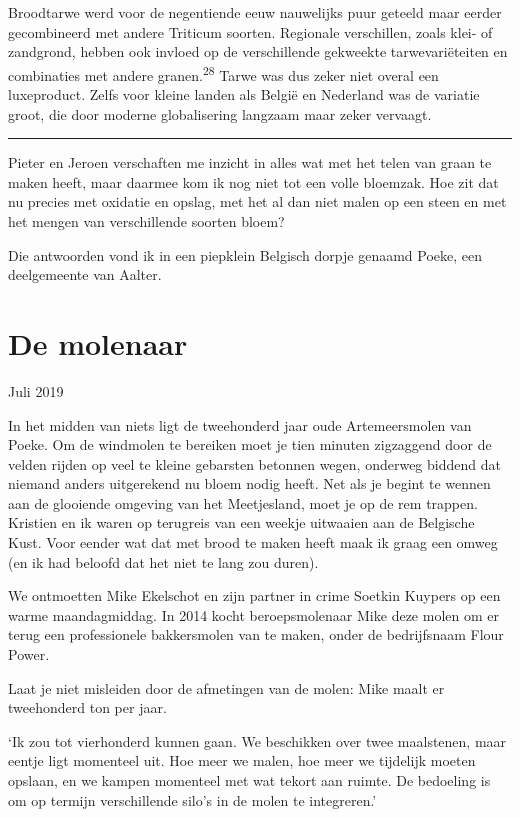 \documentclass[
  11pt,
  dutch,
]{memoir}
\begin{document}
Broodtarwe werd voor de negentiende eeuw nauwelijks puur geteeld maar
eerder gecombineerd met andere Triticum soorten. Regionale verschillen,
zoals klei- of zandgrond, hebben ook invloed op de verschillende
gekweekte tarwevariëteiten en combinaties met andere
granen.\textsuperscript{28} Tarwe was dus zeker niet overal een
luxeproduct. Zelfs voor kleine landen als België en Nederland was de
variatie groot, die door moderne globalisering langzaam maar zeker
vervaagt.

\pfbreak

Pieter en Jeroen verschaften me inzicht in alles wat met het telen van
graan te maken heeft, maar daarmee kom ik nog niet tot een volle
bloemzak. Hoe zit dat nu precies met oxidatie en opslag, met het al dan
niet malen op een steen en met het mengen van verschillende soorten
bloem?

Die antwoorden vond ik in een piepklein Belgisch dorpje genaamd Poeke,
een deelgemeente van Aalter.

\hypertarget{de-molenaar}{%
\section{De molenaar}\label{de-molenaar}}

\label{molenaar}

\begin{flushright}
Juli 2019
\end{flushright}

In het midden van niets ligt de tweehonderd jaar oude Artemeersmolen van
Poeke. Om de windmolen te bereiken moet je tien minuten zigzaggend door
de velden rijden op veel te kleine gebarsten betonnen wegen, onderweg
biddend dat niemand anders uitgerekend nu bloem nodig heeft. Net als je
begint te wennen aan de glooiende omgeving van het Meetjesland, moet je
op de rem trappen. Kristien en ik waren op terugreis van een weekje
uitwaaien aan de Belgische Kust. Voor eender wat dat met brood te maken
heeft maak ik graag een omweg (en ik had beloofd dat het niet te lang
zou duren).

We ontmoetten Mike Ekelschot en zijn partner in crime Soetkin Kuypers op
een warme maandagmiddag. In 2014 kocht beroepsmolenaar Mike deze molen
om er terug een professionele bakkersmolen van te maken, onder de
bedrijfsnaam Flour Power.

Laat je niet misleiden door de afmetingen van de molen: Mike maalt er
tweehonderd ton per jaar.

`Ik zou tot vierhonderd kunnen gaan. We beschikken over twee maalstenen,
maar eentje ligt momenteel uit. Hoe meer we malen, hoe meer we tijdelijk
moeten opslaan, en we kampen momenteel met wat tekort aan ruimte. De
bedoeling is om op termijn verschillende silo's in de molen te
integreren.'
\end{document}
